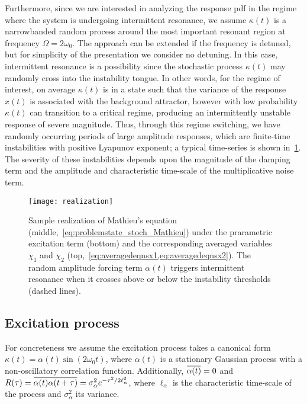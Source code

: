 \documentclass[3p]{elsarticle}
\newcommand{\overbar}[1]{\mkern 1mu\overline{\mkern-1mu#1\mkern-1mu}\mkern 1mu}
\begin{document}
Furthermore,   since we are interested in analyzing the response pdf in the regime   where the system is undergoing intermittent resonance,  we assume $\kappa(t)$ is a narrowbanded random process around the most  important resonant  region at frequency $\Omega = 2\omega_0$. The approach can be extended if the frequency is  detuned,   but for simplicity of the presentation we consider no detuning. In this case, intermittent resonance is a possibility since the stochastic process  $\kappa(t)$  may randomly cross into the instability tongue. In other words, for the regime of interest,  on    average $\kappa(t)$ is in a state such that the variance of the response $x(t)$ is associated with the background attractor, however with low probability   $\kappa(t)$ can transition to  a critical regime, producing an intermittently  unstable  response of severe magnitude. Thus, through this regime switching, we have randomly occurring periods of large amplitude responses, which are finite-time instabilities with   positive Lyapunov exponent; a typical time-series is shown in~\cref{fig:real_mathiue}. The severity of these instabilities   depends upon the   magnitude of the damping term and the amplitude and characteristic time-scale  of the multiplicative  noise term.  
\begin{figure}[htb]
    \centering
    \texttt{[image: realization]}
    \caption{Sample realization of  Mathieu's equation (middle,~\cref{eq:problemstate_stoch_Mathieu}) under the prarametric excitation term (bottom) and the corresponding averaged variables $\chi_1$ and $\chi_2$ (top,~\cref{eq:averagedeqnsx1,eq:averagedeqnsx2}). The random amplitude forcing  term $\alpha(t)$  triggers intermittent resonance when it crosses above or below the instability thresholds (dashed lines).}
    \label{fig:real_mathiue}
\end{figure}


\subsection{Excitation process}
For concreteness we assume the excitation process takes a canonical form $\kappa(t) = \alpha(t) \sin(2\omega_0 t)$, where $\alpha(t)$ is a stationary Gaussian process with a non-oscillatory correlation function. Additionally,   $\overbar{\alpha(t)} = 0$ and  $R(\tau) = \overbar{\alpha(t)\alpha(t+\tau)} = \sigma_\alpha^2 e^{-\tau^2/2\ell_\alpha^2}$, where $\ell_\alpha$ is the characteristic time-scale of the process and $\sigma_\alpha^2$ its variance.
\end{document}

